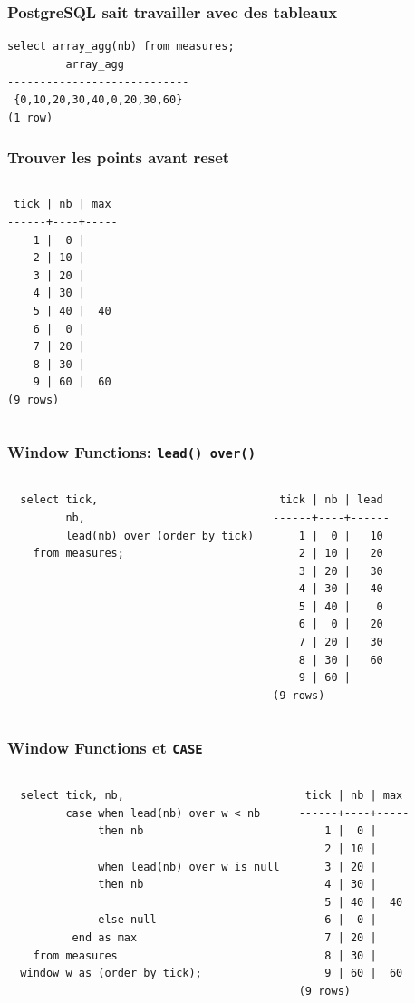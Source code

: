 \documentclass{beamer}
\begin{document}
\begin{frame}[fragile]
  \frametitle{PostgreSQL sait travailler avec des tableaux}

\begin{verbatim}
select array_agg(nb) from measures;
         array_agg          
----------------------------
 {0,10,20,30,40,0,20,30,60}
(1 row)
\end{verbatim}
\end{frame}

\begin{frame}[fragile]
  \frametitle{Trouver les points avant reset}

\begin{columns}
\begin{verbatim}
 tick | nb | max 
------+----+-----
    1 |  0 |    
    2 | 10 |    
    3 | 20 |    
    4 | 30 |    
    5 | 40 |  40
    6 |  0 |    
    7 | 20 |    
    8 | 30 |    
    9 | 60 |  60
(9 rows)
\end{verbatim}
\end{columns}
\end{frame}

\begin{frame}[fragile]
  \frametitle{Window Functions: \texttt{lead() over()}}

\begin{columns}
\begin{verbatim}
  select tick,
         nb,
         lead(nb) over (order by tick)
    from measures;
\end{verbatim}

\begin{verbatim}
 tick | nb | lead 
------+----+------
    1 |  0 |   10
    2 | 10 |   20
    3 | 20 |   30
    4 | 30 |   40
    5 | 40 |    0
    6 |  0 |   20
    7 | 20 |   30
    8 | 30 |   60
    9 | 60 |     
(9 rows)
\end{verbatim}
\end{columns}
\end{frame}

\begin{frame}[fragile]
  \frametitle{Window Functions et \texttt{CASE}}

\begin{columns}
\begin{verbatim}
  select tick, nb,
         case when lead(nb) over w < nb
              then nb

              when lead(nb) over w is null
              then nb

              else null
          end as max
    from measures
  window w as (order by tick);
\end{verbatim}
\begin{verbatim}
 tick | nb | max 
------+----+-----
    1 |  0 |    
    2 | 10 |    
    3 | 20 |    
    4 | 30 |    
    5 | 40 |  40
    6 |  0 |    
    7 | 20 |    
    8 | 30 |    
    9 | 60 |  60
(9 rows)
\end{verbatim}
\end{columns}
\end{frame}
\end{document}
